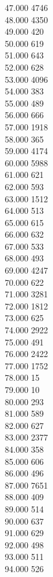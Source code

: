 { 47.000	4746 \\
 48.000	4350 \\
 49.000	420 \\
 50.000	619 \\
 51.000	643 \\
 52.000	628 \\
 53.000	4096 \\
 54.000	383 \\
 55.000	489 \\
 56.000	666 \\
 57.000	1918 \\
 58.000	365 \\
 59.000	4174 \\
 60.000	5988 \\
 61.000	621 \\
 62.000	593 \\
 63.000	1512 \\
 64.000	513 \\
 65.000	615 \\
 66.000	632 \\
 67.000	533 \\
 68.000	493 \\
 69.000	4247 \\
 70.000	622 \\
 71.000	3281 \\
 72.000	1812 \\
 73.000	625 \\
 74.000	2922 \\
 75.000	491 \\
 76.000	2422 \\
 77.000	1752 \\
 78.000	15 \\
 79.000	10 \\
 80.000	293 \\
 81.000	589 \\
 82.000	627 \\
 83.000	2377 \\
 84.000	358 \\
 85.000	606 \\
 86.000	496 \\
 87.000	7651 \\
 88.000	409 \\
 89.000	514 \\
 90.000	637 \\
 91.000	629 \\
 92.000	498 \\
 93.000	511 \\
 94.000	526 \\
}

